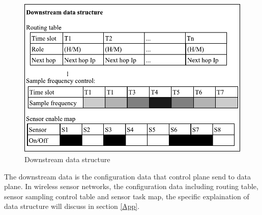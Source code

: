 \begin{figure}[htbp]
	\centering
	\includegraphics[width=1\columnwidth]{Figure/downstream}
	\caption{Downstream data structure}
	\label{downstream}
\end{figure}

The downstream data is the configuration data that control plane send to data plane. In wireless sensor networks, 
the configuration data including routing table, sensor sampling control table and sensor task map, the specific explaination of data structure will discuss in section \ref{App}.

